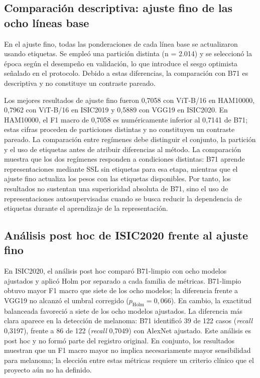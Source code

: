 \FloatBarrier



\subsection{Comparación descriptiva: ajuste fino de las ocho líneas base}

En el ajuste fino, todas las ponderaciones de cada línea base se actualizaron usando etiquetas. Se empleó una partición distinta (n = 2.014) y se seleccionó la época según el desempeño en validación, lo que introduce el sesgo optimista señalado en el protocolo. Debido a estas diferencias, la comparación con B71 es descriptiva y no constituye un contraste pareado.

Los mejores resultados de ajuste fino fueron 0,7058 con ViT-B/16 en HAM10000, 0,7962 con ViT-B/16 en ISIC2019 y 0,5889 con VGG19 en ISIC2020. En HAM10000, el F1 macro de 0,7058 es numéricamente inferior al 0,7141 de B71; estas cifras proceden de particiones distintas y no constituyen un contraste pareado. La comparación entre regímenes debe distinguir el conjunto, la partición y el uso de etiquetas antes de atribuir diferencias al método. La comparación muestra que los dos regímenes responden a condiciones distintas: B71 aprende representaciones mediante SSL sin etiquetas para esa etapa, mientras que el ajuste fino actualiza los pesos con las etiquetas disponibles. Por tanto, los resultados no sustentan una superioridad absoluta de B71, sino el uso de representaciones autosupervisadas cuando se busca reducir la dependencia de etiquetas durante el aprendizaje de la representación.

\subsection{Análisis post hoc de ISIC2020 frente al ajuste fino}

En ISIC2020, el análisis post hoc comparó B71-limpio con ocho modelos ajustados y aplicó Holm por separado a cada familia de métricas. B71-limpio obtuvo mayor F1 macro que siete de los ocho modelos; la diferencia frente a VGG19 no alcanzó el umbral corregido ($p_{\text{Holm}}=0{,}066$). En cambio, la exactitud balanceada favoreció a siete de los ocho modelos ajustados. La diferencia más clara aparece en la detección de melanoma: B71 identificó 39 de 122 casos (\textit{recall} 0,3197), frente a 86 de 122 (\textit{recall} 0,7049) con AlexNet ajustado. Este análisis es post hoc y no formó parte del registro original. En conjunto, los resultados muestran que un F1 macro mayor no implica necesariamente mayor sensibilidad para melanoma; la elección entre estas métricas requiere un criterio clínico que el proyecto aún no ha definido.



